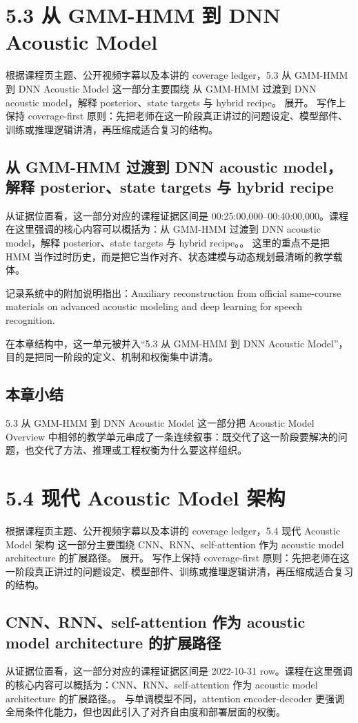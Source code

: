 \documentclass[a4paper]{article}
\begin{document}
\section{5.3 从 GMM-HMM 到 DNN Acoustic Model}
根据课程页主题、公开视频字幕以及本讲的 coverage ledger，5.3 从 GMM-HMM 到 DNN Acoustic Model 这一部分主要围绕 从 GMM-HMM 过渡到 DNN acoustic model，解释 posterior、state targets 与 hybrid recipe。 展开。
写作上保持 coverage-first 原则：先把老师在这一阶段真正讲过的问题设定、模型部件、训练或推理逻辑讲清，再压缩成适合复习的结构。

\subsection{从 GMM-HMM 过渡到 DNN acoustic model，解释 posterior、state targets 与 hybrid recipe}
从证据位置看，这一部分对应的课程证据区间是 00:25:00,000--00:40:00,000。课程在这里强调的核心内容可以概括为：从 GMM-HMM 过渡到 DNN acoustic model，解释 posterior、state targets 与 hybrid recipe。。
这里的重点不是把 HMM 当作过时历史，而是把它当作对齐、状态建模与动态规划最清晰的教学载体。

记录系统中的附加说明指出：Auxiliary reconstruction from official same-course materials on advanced acoustic modeling and deep learning for speech recognition.

在本章结构中，这一单元被并入“5.3 从 GMM-HMM 到 DNN Acoustic Model”，目的是把同一阶段的定义、机制和权衡集中讲清。

\subsection{本章小结}
5.3 从 GMM-HMM 到 DNN Acoustic Model 这一部分把 Acoustic Model Overview 中相邻的教学单元串成了一条连续叙事：既交代了这一阶段要解决的问题，也交代了方法、推理或工程权衡为什么要这样组织。

\section{5.4 现代 Acoustic Model 架构}
根据课程页主题、公开视频字幕以及本讲的 coverage ledger，5.4 现代 Acoustic Model 架构 这一部分主要围绕 CNN、RNN、self-attention 作为 acoustic model architecture 的扩展路径。 展开。
写作上保持 coverage-first 原则：先把老师在这一阶段真正讲过的问题设定、模型部件、训练或推理逻辑讲清，再压缩成适合复习的结构。

\subsection{CNN、RNN、self-attention 作为 acoustic model architecture 的扩展路径}
从证据位置看，这一部分对应的课程证据区间是 2022-10-31 row。课程在这里强调的核心内容可以概括为：CNN、RNN、self-attention 作为 acoustic model architecture 的扩展路径。。
与单调模型不同，attention encoder-decoder 更强调全局条件化能力，但也因此引入了对齐自由度和部署层面的权衡。
\end{document}
